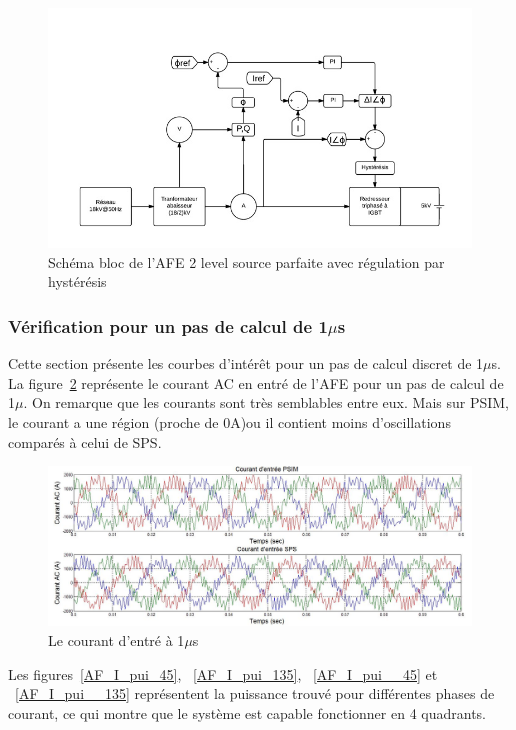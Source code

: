\documentclass[11pt,letterpaper,final]{report}
\begin{document}
\begin{figure}[htb]
\centering
\includegraphics[scale=0.5]{Fig/AFEIDEAL/AFE.jpg}
\caption{Schéma bloc de l'AFE 2 level source parfaite avec régulation par hystérésis}
\label{AFE}
\end{figure}

\subsubsection{Vérification pour un pas de calcul de 1$\mu$s}
Cette section présente les courbes d'intérêt pour un pas de calcul discret de 1$\mu$s. La figure~\ref{AF_I_cou} représente le courant AC en entré de l'AFE pour un pas de calcul de 1$\mu$. On remarque que les courants sont très semblables entre eux. Mais sur PSIM, le courant a une région (proche de 0A)ou il contient moins d'oscillations comparés à celui de SPS.


\begin{figure}[htb]
\centering
\includegraphics[scale=0.5]{Fig/AFEIDEAL/CourantAC.jpg}
\caption{Le courant d'entré à 1$\mu$s}
\label{AF_I_cou}
\end{figure}

Les figures~\ref{AF_I_pui_45}, ~\ref{AF_I_pui_135}, ~\ref{AF_I_pui__45} et ~\ref{AF_I_pui__135} représentent la puissance trouvé pour différentes phases de courant, ce qui montre que le système est capable fonctionner en 4 quadrants.
\end{document}
